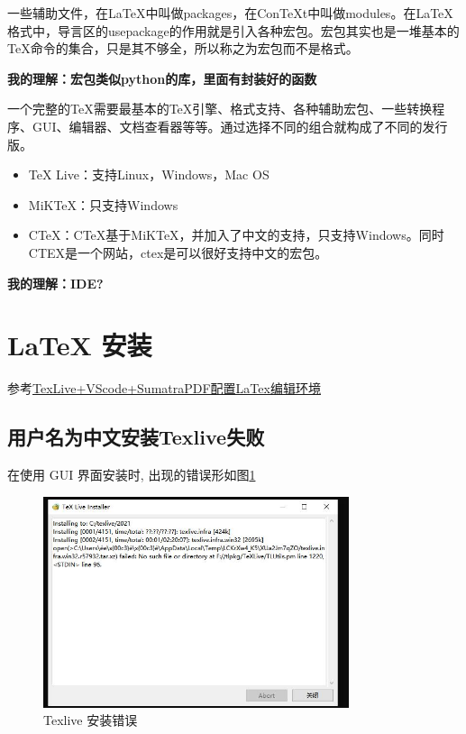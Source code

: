 \begin{explain*}[宏包]
    一些辅助文件，在LaTeX中叫做packages，在ConTeXt中叫做modules。在LaTeX格式中，导言区的usepackage的作用就是引入各种宏包。宏包其实也是一堆基本的TeX命令的集合，只是其不够全，所以称之为宏包而不是格式。

    \bf{我的理解：宏包类似python的库，里面有封装好的函数}
\end{explain*}

\begin{explain*}[发行版]
    一个完整的TeX需要最基本的TeX引擎、格式支持、各种辅助宏包、一些转换程序、GUI、编辑器、文档查看器等等。通过选择不同的组合就构成了不同的发行版。
    \begin{itemize}
        \item TeX Live：支持Linux，Windows，Mac OS
        \item MiKTeX：只支持Windows
        \item CTeX：CTeX基于MiKTeX，并加入了中文的支持，只支持Windows。同时CTEX是一个网站，ctex是可以很好支持中文的宏包。
    \end{itemize}

    \bf{我的理解：IDE?}
\end{explain*}

\section{\LaTeX{} 安装}\label{sec:latexinstall}
参考\href{https://summersong.top/post/1f879cd9.html}{TexLive+VScode+SumatraPDF配置LaTex编辑环境}

\subsection{用户名为中文安装Texlive失败}\label{subsec:texlive_cn_username}
在使用 GUI 界面安装时, 出现的错误形如图\ref{fig:failuregui}
\begin{figure}[!h]
    \centering
    \includegraphics[width=0.8\textwidth]{figure/chap-basic/failuregui.jpg}
    \caption{Texlive 安装错误}\label{fig:failuregui}
\end{figure}

